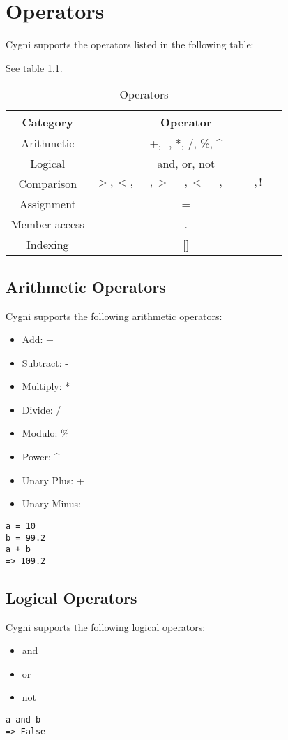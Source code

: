 \chapter{Operators}
Cygni supports the operators listed in the following table:

See table \ref{operators}.
\begin{table}
	\centering
	\begin{tabular}{|c|c|}
		\hline
		Category & Operator \\ 
		\hline
		Arithmetic & +, -, *, /, \%, \^{} \\
		\hline
		Logical & and, or, not \\
		\hline
		Comparison & $ >,<,=,>=,<=,==,!= $\\
		\hline
		Assignment & = \\
		\hline
		Member access & . \\
		\hline 
		Indexing & [] \\
		\hline
		\end{tabular}
\label{operators}
\caption{Operators}
\end{table}

\section{Arithmetic Operators}
Cygni supports the following arithmetic operators:
\begin{itemize}
 	\item Add: +
 	\item Subtract: -
 	\item Multiply: *
 	\item Divide: /
 	\item Modulo: \%
 	\item Power: \^{}
 	\item Unary Plus: +
 	\item Unary Minus: -
\end{itemize}
\begin{lstlisting}
a = 10
b = 99.2
a + b
=> 109.2
\end{lstlisting}
\section{Logical Operators}
Cygni supports the following logical operators:
\begin{itemize}
 	\item and
 	\item or
 	\item not
\end{itemize}
\begin{lstlisting}
a and b
=> False
\end{lstlisting}
